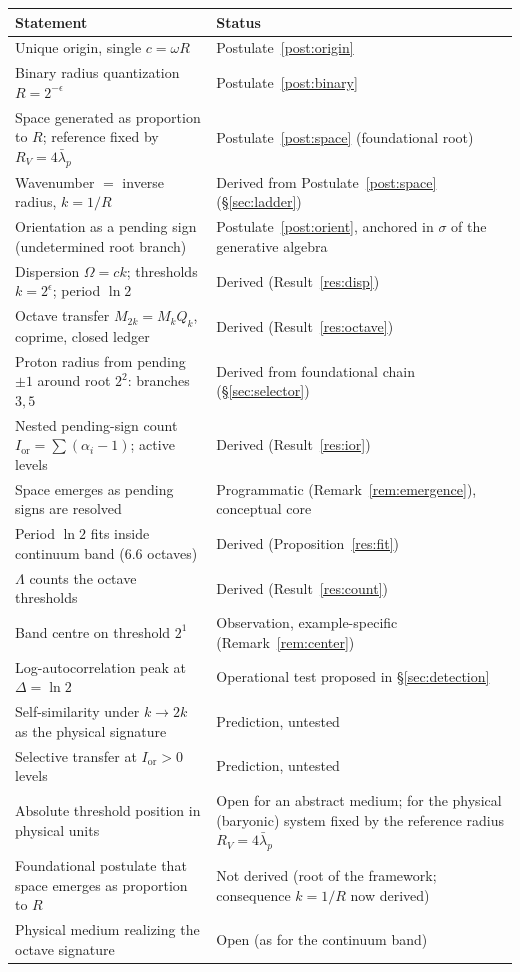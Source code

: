 \documentclass[11pt,a4paper]{article}
\newcommand{\Ior}{I_{\mathrm{or}}}
\begin{document}
\begin{center}
\renewcommand{\arraystretch}{1.2}
\begin{tabular}{>{\raggedright\arraybackslash}p{7.6cm} >{\raggedright\arraybackslash}p{5.6cm}}
\toprule
Statement & Status\\
\midrule
Unique origin, single $c=\omega R$ & Postulate~\ref{post:origin}\\
Binary radius quantization $R=2^{-\epsilon}$ & Postulate~\ref{post:binary}\\
Space generated as proportion to $R$; reference fixed by $R_V=4\bar\lambda_p$ & Postulate~\ref{post:space} (foundational root)\\
Wavenumber $=$ inverse radius, $k=1/R$ & Derived from Postulate~\ref{post:space} (\S\ref{sec:ladder})\\
Orientation as a pending sign (undetermined root branch) & Postulate~\ref{post:orient}, anchored in $\sigma$ of the generative algebra\\
Dispersion $\Omega=ck$; thresholds $k=2^\epsilon$; period $\ln 2$ & Derived (Result~\ref{res:disp})\\
Octave transfer $M_{2k}=M_k Q_k$, coprime, closed ledger & Derived (Result~\ref{res:octave})\\
Proton radius from pending $\pm1$ around root $2^2$: branches $3,5$ & Derived from foundational chain (\S\ref{sec:selector})\\
Nested pending-sign count $\Ior=\sum(\alpha_i-1)$; active levels & Derived (Result~\ref{res:ior})\\
Space emerges as pending signs are resolved & Programmatic (Remark~\ref{rem:emergence}), conceptual core\\
Period $\ln 2$ fits inside continuum band ($6.6$ octaves) & Derived (Proposition~\ref{res:fit})\\
$\Lambda$ counts the octave thresholds & Derived (Result~\ref{res:count})\\
Band centre on threshold $2^1$ & Observation, example-specific (Remark~\ref{rem:center})\\
Log-autocorrelation peak at $\Delta=\ln2$ & Operational test proposed in \S\ref{sec:detection}\\
Self-similarity under $k\to2k$ as the physical signature & Prediction, untested\\
Selective transfer at $\Ior>0$ levels & Prediction, untested\\
Absolute threshold position in physical units & Open for an abstract medium; for the physical (baryonic) system fixed by the reference radius $R_V=4\bar\lambda_p$\\
Foundational postulate that space emerges as proportion to $R$ & Not derived (root of the framework; consequence $k=1/R$ now derived)\\
Physical medium realizing the octave signature & Open (as for the continuum band)\\
\bottomrule
\end{tabular}
\end{center}
\end{document}
